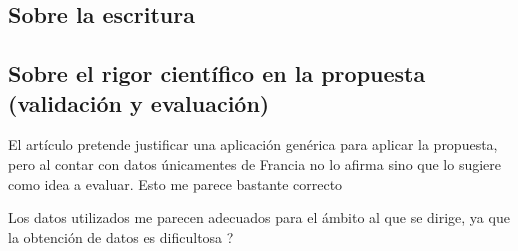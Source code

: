 \documentclass[13pt,a4paper]{article}
\makeatletter
\newcommand*{\centerfloat}{%
  \parindent \z@
  \leftskip \z@ \@plus 1fil \@minus \textwidth
  \rightskip\leftskip
  \parfillskip \z@skip}
\makeatother
\begin{document}
\subsection{Sobre la escritura}


\subsection{Sobre el rigor científico en la propuesta (validación y evaluación)}

El artículo pretende justificar una aplicación genérica para aplicar la propuesta, pero al contar con datos únicamentes de Francia no lo afirma sino que lo sugiere como idea a evaluar. Esto me parece bastante correcto 

Los datos utilizados me parecen adecuados para el ámbito al que se dirige, ya que la obtención de datos es dificultosa ?



\end{document}
